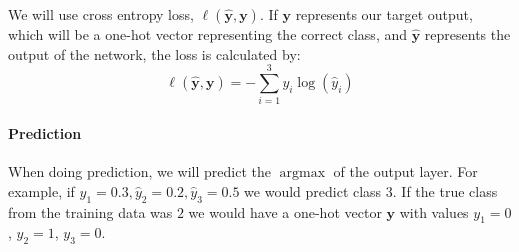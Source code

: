 \documentclass[11pt]{article}
\numberwithin{equation}{section} %
\numberwithin{figure}{section} %
\numberwithin{table}{section} %
\newcommand{\yv}{\mathbf{y}}
\newcommand \argmax {\operatorname*{argmax}}
\begin{document}
We will use cross entropy loss, $\ell(\hat{\yv},\yv)$. If $\yv$ represents our target output, which will be a one-hot vector representing the correct class, and $\hat{\yv}$ represents the output of the network, the loss is calculated by:
\begin{equation}
   \ell(\hat{\yv},\yv) = - \sum_{i=1}^3 y_i \log(\hat{y}_i)
\end{equation}

\paragraph{Prediction}
When doing prediction, we will predict the $\argmax$ of the output layer. For example, if $\hat{y}_1=0.3, \hat{y}_2=0.2, \hat{y}_3=0.5$ we would predict class 3. If the true class from the training data was $2$ we would have a one-hot vector $\yv$ with values $y_1=0$, $y_2=1$, $y_3=0$.
    
\end{document}
